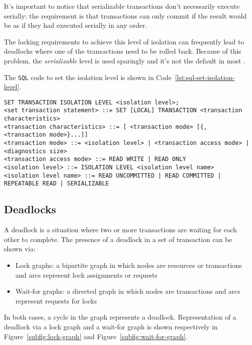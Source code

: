 \documentclass[english]{article}
\begin{document}
\bigskip
It's important to notice that serializable transactions don't necessarily execute serially:
the requirement is that transactions can only commit if the result would be as if they had executed serially in any order.

The locking requirements to achieve this level of isolation can frequently lead to deadlocks where one of the transactions need to be rolled back.
Because of this problem, the \textit{serializable} level is used sparingly and it's not the default in most \DBMS.

\bigskip
The \texttt{SQL} code to set the isolation level is shown in Code~\ref{lst:sql-set-isolation-level}.

\begin{lstlisting}[style=customsql, caption={\texttt{SQL} statement to set the isolation level of a transaction}, label={lst:sql-set-isolation-level}]
SET TRANSACTION ISOLATION LEVEL <isolation level>;
<set transaction statement> ::= SET [LOCAL] TRANSACTION <transaction characteristics>
<transaction characteristics> ::= [ <transaction mode> [{, <transaction mode>}...]]
<transaction mode> ::= <isolation level> | <transaction access mode> | <diagnostics size>
<transaction access mode> ::= READ WRITE | READ ONLY
<isolation level> ::= ISOLATION LEVEL <isolation level name>
<isolation level name> ::= READ UNCOMMITTED | READ COMMITTED | REPEATABLE READ | SERIALIZABLE
\end{lstlisting}

\subsection{Deadlocks}
\label{sec:deadlocks}

A deadlock is a situation where two or more transactions are waiting for each other to complete.
The presence of a deadlock in a set of transaction can be shown via:

\begin{itemize}
  \item Lock graphs: a bipartite graph in which nodes are resources or transactions and arcs represent lock assignments or requests
  \item Wait-for graphs: a directed graph in which nodes are transactions and arcs represent requests for locks
\end{itemize}

In both cases, a cycle in the graph represents a deadlock.
Representation of a deadlock via a lock graph and a wait-for graph is shown respectively in Figure~\ref{subfig:lock-graph} and Figure~\ref{subfig:wait-for-graph}.
\end{document}

